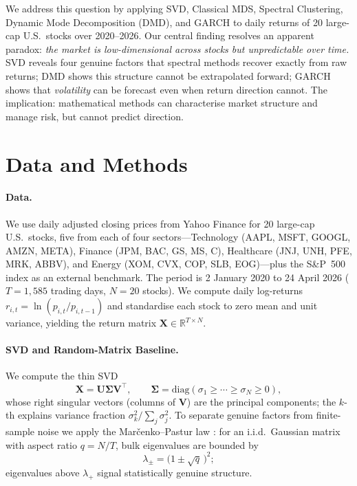 \documentclass[runningheads]{llncs}
\begin{document}
We address this question by applying SVD, Classical MDS, Spectral Clustering,
Dynamic Mode Decomposition (DMD), and GARCH to daily returns of 20 large-cap
U.S.\ stocks over 2020--2026.
Our central finding resolves an apparent paradox:
\emph{the market is low-dimensional across stocks but unpredictable over time.}
SVD reveals four genuine factors that spectral methods recover exactly from raw
returns; DMD shows this structure cannot be extrapolated forward; GARCH shows
that \emph{volatility} can be forecast even when return direction cannot.
The implication: mathematical methods can characterise market structure and
manage risk, but cannot predict direction.


\section{Data and Methods}

\paragraph{Data.}
We use daily adjusted closing prices from Yahoo Finance for 20 large-cap U.S.\
stocks, five from each of four sectors—Technology (AAPL, MSFT, GOOGL, AMZN,
META), Finance (JPM, BAC, GS, MS, C), Healthcare (JNJ, UNH, PFE, MRK, ABBV),
and Energy (XOM, CVX, COP, SLB, EOG)—plus the S\&P~500 index as an external
benchmark.
The period is 2 January 2020 to 24 April 2026 ($T = 1{,}585$ trading days,
$N = 20$ stocks).
We compute daily log-returns $r_{i,t} = \ln(p_{i,t}/p_{i,t-1})$ and standardise
each stock to zero mean and unit variance, yielding the return matrix
$\mathbf{X} \in \mathbb{R}^{T \times N}$.

\paragraph{SVD and Random-Matrix Baseline.}
We compute the thin SVD
\begin{equation}
  \mathbf{X} = \mathbf{U}\boldsymbol{\Sigma}\mathbf{V}^\top,\qquad
  \boldsymbol{\Sigma}=\mathrm{diag}(\sigma_1\geq\cdots\geq\sigma_N\geq 0),
  \label{eq:svd}
\end{equation}
whose right singular vectors (columns of $\mathbf{V}$) are the principal
components; the $k$-th explains variance fraction $\sigma_k^2/\sum_j\sigma_j^2$.
To separate genuine factors from finite-sample noise we apply the
Mar\v{c}enko--Pastur law \citep{marchenko1967distribution}: for an i.i.d.\
Gaussian matrix with aspect ratio $q=N/T$, bulk eigenvalues are bounded by
\begin{equation}
  \lambda_{\pm} = \bigl(1\pm\sqrt{q}\,\bigr)^2;
  \label{eq:mp}
\end{equation}
eigenvalues above $\lambda_+$ signal statistically genuine structure.
\end{document}
